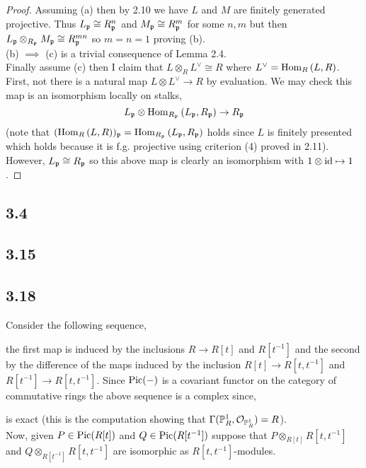 \documentclass[12pt]{extarticle}
\begin{document}
\begin{proof}
Assuming (a) then by 2.10 we have $L$ and $M$ are finitely generated projective. Thus $L_{\mathfrak{p}} \cong R_{\mathfrak{p}}^n$ and $M_{\mathfrak{p}} \cong R_{\mathfrak{p}}^m$ for some $n,m$ but then $L_{\mathfrak{p}} \otimes_{R_{\mathfrak{p}}} M_{\mathfrak{p}} \cong R_{\mathfrak{p}}^{mn}$ so $m = n = 1$ proving (b).
\bigskip\\
(b) $\implies$ (c) is a trivial consequence of Lemma 2.4.
\bigskip\\
Finally assume (c) then I claim that $L \otimes_R L^\vee \cong R$ where $L^\vee = \mathrm{Hom}_{R}\left( L , R \right)$. First, not there is a natural map $L \otimes L^\vee \to R$ by evaluation. We may check this map is an isomorphism locally on stalks,
\[ L_{\mathfrak{p}} \otimes \mathrm{Hom}_{R_{\mathfrak{p}}}\left( L_{\mathfrak{p}} , R_{\mathfrak{p}} \right) \to R_{\mathfrak{p}} \]
(note that $(\mathrm{Hom}_{R}\left( L , R \right))_{\mathfrak{p}} = \mathrm{Hom}_{R_{\mathfrak{p}}}\left( L_{\mathfrak{p}} , R_{\mathfrak{p}} \right)$ holds since $L$ is finitely presented which holds because it is f.g. projective using criterion (4) proved in 2.11). However, $L_{\mathfrak{p}} \cong R_{\mathfrak{p}}$ so this above map is clearly an isomorphism with $1 \otimes \mathrm{id} \mapsto 1$.  
\end{proof}

\subsection{3.4}

\subsection{3.15}

\subsection{3.18}

Consider the following sequence,
\begin{center}
\end{center}
the first map is induced by the inclusions $R \to R[t]$ and $R[t^{-1}]$ and the second by the difference of the maps induced by the inclusion $R[t] \to R[t, t^{-1}]$ and $R[t^{-1}] \to R[t, t^{-1}]$. Since $\mathrm{Pic}(-)$ is a covariant functor on the category of commutative rings the above sequence is a complex since,
\begin{center}
\end{center}
is exact (this is the computation showing that $\Gamma(\mathbb{P}^1_R, \mathcal{O}_{\mathbb{P}^1_R}) = R$). 
\bigskip\\
Now, given $P \in \mathrm{Pic}(R[t])$ and $Q \in \mathrm{Pic}(R[t^{-1}])$ suppose that $P \otimes_{R[t]} R[t, t^{-1}]$ and $Q \otimes_{R[t^{-1}]} R[t, t^{-1}]$ are isomorphic as $R[t, t^{-1}]$-modules.
\end{document}
